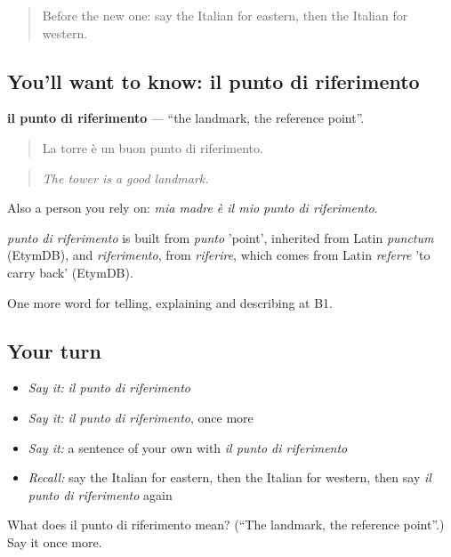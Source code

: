 \label{lesson:IT-C443-punto-di-riferimento}



\begin{quote}
Before the new one: say the Italian for eastern, then the Italian for western.
\end{quote}

\subsection*{You'll want to know: il punto di riferimento}
\textbf{il punto di riferimento} — \textquotedblleft{}the landmark, the reference point\textquotedblright{}.

\begin{quote}
La torre è un buon punto di riferimento.
\end{quote}

\begin{quote}
\emph{The tower is a good landmark.}
\end{quote}

Also a person you rely on: \emph{mia madre è il mio punto di riferimento}.

\begin{cousinweb}
\emph{punto di riferimento} is built from \emph{punto} 'point', inherited from Latin \emph{punctum} (EtymDB), and \emph{riferimento}, from \emph{riferire}, which comes from Latin \emph{referre} 'to carry back' (EtymDB).
\end{cousinweb}

\begin{grammarlens}[title={What you've built}]
One more word for telling, explaining and describing at B1.
\end{grammarlens}

\subsection*{Your turn}
\begin{itemize}
\raggedright
  \item \emph{Say it:} \emph{il punto di riferimento}
  \item \emph{Say it:} \emph{il punto di riferimento}, once more
  \item \emph{Say it:} a sentence of your own with \emph{il punto di riferimento}
  \item \emph{Recall:} say the Italian for eastern, then the Italian for western, then say \emph{il punto di riferimento} again
\end{itemize}

\begin{tcolorbox}[breakable,colback=teal!4,colframe=teal!35!black,title={Before you move on}]
What does il punto di riferimento mean? (\textquotedblleft{}The landmark, the reference point\textquotedblright{}.) Say it once more.
\end{tcolorbox}
